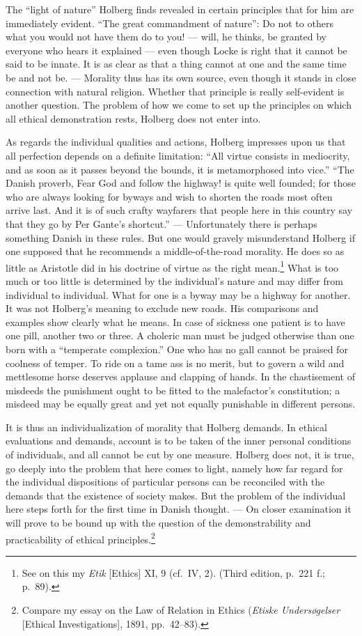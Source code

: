 \documentclass[12pt,a4paper]{book}
\newcommand{\opage}[1]{\marginnote{\footnotesize\textit{[#1]}}}
\begin{document}
The ``light of nature'' Holberg finds revealed in certain principles that for him
are immediately evident. ``The great commandment of nature'': Do not to others
what you would not have them do to you! --- will, he thinks, be granted by
everyone who hears it explained --- even though Locke is right that it cannot be
said to be innate. It is \opage{11}as clear as that a thing cannot at one and the same time
be and not be. --- Morality thus has its own source, even though it stands in
close connection with natural religion. Whether that principle is really
self-evident is another question. The problem of how we come to set up the
principles on which all ethical demonstration rests, Holberg does not enter into.

As regards the individual qualities and actions, Holberg impresses upon us that
all perfection depends on a definite limitation: ``All virtue consists in
mediocrity, and as soon as it passes beyond the bounds, it is metamorphosed into
vice.'' ``The Danish proverb, Fear God and follow the highway! is quite well
founded; for those who are always looking for byways and wish to shorten the
roads most often arrive last. And it is of such crafty wayfarers that people here
in this country say that they go by Per Gante's shortcut.'' --- Unfortunately
there is perhaps something Danish in these rules. But one would gravely
misunderstand Holberg if one supposed that he recommends a middle-of-the-road
morality. He does so as little as Aristotle did in his doctrine of virtue as the
right mean.\footnote{See on this my \emph{Etik} [Ethics] XI, 9 (cf.\ IV, 2).
(Third edition, p.~221 f.; p.~89).} What is too much or too little is determined
by the individual's nature and may differ from individual to individual. What for
one is a byway may be a highway for another. It was not Holberg's meaning to
exclude new roads. His comparisons and examples show clearly what he means. In
case of sickness one patient is to have one pill, another two or three. A choleric
man must be judged otherwise than one born with a ``temperate complexion.'' One
who has no gall cannot be praised for coolness of temper. To ride on a tame ass is
no merit, but to govern a wild and mettlesome horse deserves applause and clapping
of hands. In the chastisement of misdeeds the punishment ought to be fitted to the
malefactor's constitution; a misdeed may be equally great and yet not equally
punishable in different persons.

\opage{12}It is thus an individualization of morality that Holberg demands. In ethical
evaluations and demands, account is to be taken of the inner personal conditions
of individuals, and all cannot be cut by one measure. Holberg does not, it is
true, go deeply into the problem that here comes to light, namely how far regard
for the individual dispositions of particular persons can be reconciled with the
demands that the existence of society makes. But the problem of the individual
here steps forth for the first time in Danish thought. --- On closer examination
it will prove to be bound up with the question of the demonstrability and
practicability of ethical principles.\footnote{Compare my essay on the Law of
Relation in Ethics (\emph{Etiske Undersøgelser} [Ethical Investigations], 1891,
pp.~42--83).}
\end{document}
